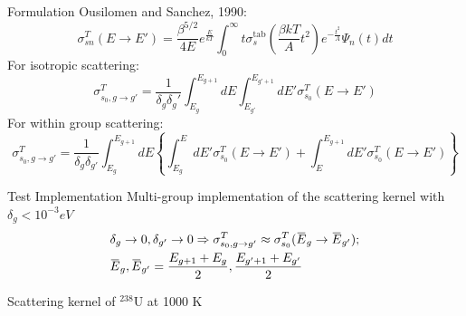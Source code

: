\documentclass[sans,mathserif,aspectratio=169]{beamer}
\newcommand{\overbar}[1]{\mkern 1.5mu\overline{\mkern-1.5mu#1\mkern-1.5mu}\mkern 1.5mu}
\newcommand*\mean[1]{\overbar{#1}}
\begin{document}
\begin{frame}{Formulation}
Ousilomen and Sanchez, 1990:
\begin{equation*}
\sigma_{sn}^T (E \to E') = \frac{\beta^{5/2}}{4E} e^{\frac{E}{kT}} \int_0^\infty t \sigma_s^{\text{tab}} \left( \frac{\beta k T}{A} t^2 \right)
e^{-\frac{t^2}{A}} \Psi_n (t) dt
\end{equation*}
\pause
For isotropic scattering:
\begin{equation*}
\sigma_{s_0, g \to g'}^T = \frac{1}{\delta_g \delta_g'} \int_{E_{g}}^{E_{g+1}} dE \int_{E_{g'}}^{E_{g'+1}} dE' \sigma_{s_0}^T (E \to E')
\end{equation*}
\pause
For within group scattering:
\begin{equation*}
\sigma_{s_0, g \to g'}^T = \frac{1}{\delta_g \delta_{g'}} \int_{E_{g}}^{E_{g+1}} dE \left\{  \int_{E_{g}}^{E} dE' \sigma_{s_0}^T (E \to E') + \int_{E}^{E_{g+1}} dE' \sigma_{s_0}^T (E \to E') \right\}
\end{equation*}
\end{frame}

\begin{frame}{Test Implementation}
Multi-group implementation of the scattering kernel with $\delta_g < 10^{-3} eV$
\begin{align*}
&\delta_g \to 0, \delta_{g'} \to 0 \Rightarrow \sigma_{s_0, g \to g'}^T \approx \sigma_{s_0}^T (\mean{E}_g \to \mean{E}_{g'}); \\
& \mean{E}_g,  \mean{E}_{g'} = \frac{E_{g+1} + E_g}{2}, \frac{E_{g'+1} + E_{g'}}{2}
\end{align*}
\end{frame}

\begin{frame}{Scattering kernel of $^{238}$U at 1000 K }
\centering
{}
\end{frame}
\end{document}
